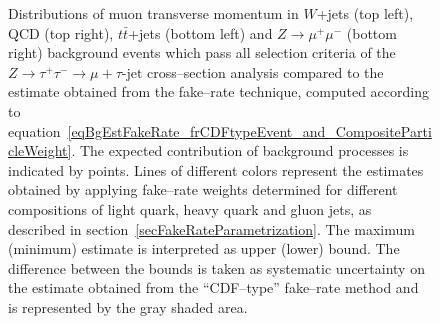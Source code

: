 \begin{figure}[t]
\begin{center}
\begin{picture}
\end{picture}
\caption{\captiontext Distributions of muon transverse momentum in
	 $W$+jets (top left), QCD (top right), $t\bar{t}$+jets (bottom left) 
         and $Z \rightarrow \mu^{+} \mu^{-}$ (bottom right) background events which pass all selection criteria 
         of the $Z \rightarrow \tau^{+} \tau^{-} \rightarrow \mu + \tau\mbox{-jet}$ cross--section analysis
	 compared to the estimate obtained from the fake--rate technique, 
         computed according to equation~\ref{eqBgEstFakeRate_frCDFtypeEvent_and_CompositeParticleWeight}.
	 The expected contribution of background processes is indicated by points.
	 Lines of different colors represent the estimates obtained by applying 
         fake--rate weights determined for different compositions of light quark, heavy quark and gluon jets,
         as described in section~\ref{secFakeRateParametrization}.
	 The maximum (minimum) estimate is interpreted as upper (lower) bound.
	 The difference between the bounds is taken as systematic uncertainty on the estimate 
         obtained from the ``CDF--type'' fake--rate method and is represented by the gray shaded area.}
\label{figBgEstFakeRate_frCDFtypeResults_muonPt}
\end{center}
\end{figure} 

